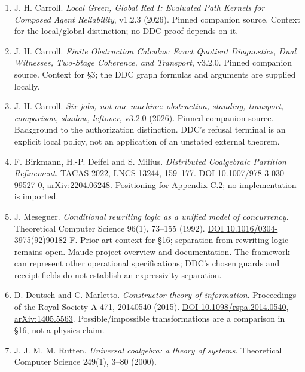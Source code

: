 \documentclass[
  11pt,
]{article}
\providecommand{\tightlist}{%
  \setlength{\itemsep}{0pt}\setlength{\parskip}{0pt}}
\renewcommand{\_}{\ddcunderscore\allowbreak}
\begin{document}
\begin{enumerate}
\def\labelenumi{\arabic{enumi}.}
\tightlist
\item
  J. H. Carroll. \emph{Local Green, Global Red I: Evaluated Path Kernels
  for Composed Agent Reliability}, v1.2.3 (2026).
  Pinned
  companion source. Context for the local/global distinction; no DDC
  proof depends on it.
\item
  J. H. Carroll. \emph{Finite Obstruction Calculus: Exact Quotient
  Diagnostics, Dual Witnesses, Two-Stage Coherence, and Transport},
  v3.2.0.
  Pinned
  companion source. Context for §3; the DDC graph formulas and
  arguments are supplied locally.
\item
  J. H. Carroll. \emph{Six jobs, not one machine: obstruction, standing,
  transport, comparison, shadow, leftover}, v3.2.0 (2026).
  Pinned
  companion source. Background to the authorization distinction. DDC's
  refusal terminal is an explicit local policy, not an application of an
  unstated external theorem.
\item
  F. Birkmann, H.-P. Deifel and S. Milius. \emph{Distributed Coalgebraic
  Partition Refinement}. TACAS 2022, LNCS 13244, 159--177.
  \href{https://doi.org/10.1007/978-3-030-99527-0_9}{DOI
  10.1007/978-3-030-99527-0\_9},
  \href{https://arxiv.org/abs/2204.06248}{arXiv:2204.06248}. Positioning
  for Appendix C.2; no implementation is imported.
\item
  J. Meseguer. \emph{Conditional rewriting logic as a unified model of
  concurrency}. Theoretical Computer Science 96(1), 73--155 (1992).
  \href{https://doi.org/10.1016/0304-3975(92)90182-F}{DOI
  10.1016/0304-3975(92)90182-F}. Prior-art context for §16; separation
  from rewriting logic remains open.
  \href{https://maude.cs.illinois.edu/overview}{Maude project overview}
  and \href{https://maude.cs.illinois.edu/documentation}{documentation}.
  The framework can represent other operational specifications; DDC's
  chosen guards and receipt fields do not establish an expressivity
  separation.
\item
  D. Deutsch and C. Marletto. \emph{Constructor theory of information}.
  Proceedings of the Royal Society A 471, 20140540 (2015).
  \href{https://doi.org/10.1098/rspa.2014.0540}{DOI
  10.1098/rspa.2014.0540},
  \href{https://arxiv.org/abs/1405.5563}{arXiv:1405.5563}.
  Possible/impossible transformations are a comparison in §16, not a
  physics claim.
\item
  J. J. M. M. Rutten. \emph{Universal coalgebra: a theory of systems}.
  Theoretical Computer Science 249(1), 3--80 (2000).

\end{enumerate}
\end{document}
